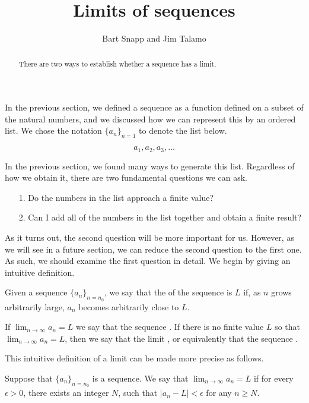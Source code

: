 \documentclass{ximera}
\author{Bart Snapp and Jim Talamo}
\title[Dig-In:]{Limits of sequences}
\begin{document}
\begin{abstract}
There are two ways to establish whether a sequence has a limit.
\end{abstract}
\maketitle

In the previous section, we defined a sequence as a function defined on a subset of the natural numbers, and we discussed how we can represent this by an ordered list.  We chose the notation $\{a_n\}_{n=1}$ to denote the list below.

\[
a_1, a_2, a_3 , \ldots
\]

In the previous section, we found many ways to generate this list.  Regardless of how we obtain it, there are two fundamental questions we can ask.
\begin{itemize}
\item[1.] Do the numbers in the list approach a finite value?
\item[2.] Can I add all of the numbers in the list together and obtain a finite result?
\end{itemize}

As it turns out, the second question will be more important for us.  However, as we will see in a future section, we can reduce the second question to the first one.  As such, we should examine the first question in detail.  We begin by giving an intuitive definition.

\begin{definition}
  Given a sequence $\{a_n\}_{n =n_0}$, we say that the  of the sequence is $L$ if, as $n$ grows arbitrarily large, $a_n$ becomes arbitrarily close to $L$. 
  
If $\lim_{n\to\infty}a_n=L$ we say that the sequence
.
If there is no finite value $L$ so that $\lim_{n\to\infty}a_n = L$,
then we say that the limit , or equivalently that
the sequence .
\end{definition}

This intuitive definition of a limit can be made more precise as follows.

\begin{definition}
\label{definition:limit-of-a-sequence}
Suppose that $\{a_n\}_{n=n_0}$ is a sequence.  We say that
$\lim_{n\to \infty}a_n=L$ if for every $\epsilon>0$, there exists an integer $N$, such that $|a_n-L|<\epsilon$ for any $n \geq N$.
\end{definition}
\end{document}
